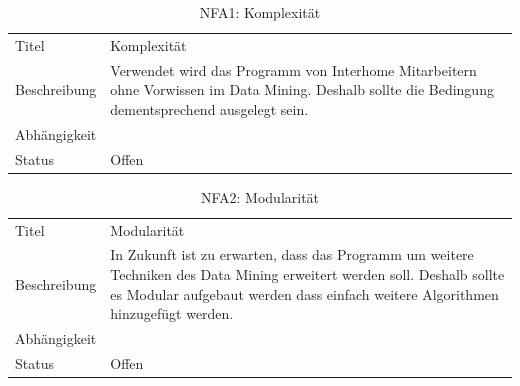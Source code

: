 
\begin{table}[H] 
	\caption{NFA1: Komplexität}
	\centering
	\label{fig:anforderungsanalyse:nichtfunktionaleanforderung:nfa1}
	\begin{tabular}{ | l | L{10cm} | } 
		\hline 
		 \\ \hline 
		Titel & Komplexität \\ \hline 
		Beschreibung & Verwendet wird das Programm von Interhome Mitarbeitern ohne Vorwissen im Data Mining. Deshalb sollte die Bedingung dementsprechend ausgelegt sein. \\ \hline 
		Abhängigkeit & \\ \hline 
		Status & Offen \\ \hline 
	\end{tabular}
\end{table}

\begin{table}[H] 
	\caption{NFA2: Modularität}
	\centering
	\label{fig:anforderungsanalyse:nichtfunktionaleanforderung:nfa2}
	\begin{tabular}{ | l | L{10cm} | } 
		\hline 
		 \\ \hline 
		Titel & Modularität \\ \hline 
		Beschreibung & In Zukunft ist zu erwarten, dass das Programm um weitere Techniken des Data Mining erweitert werden soll. Deshalb sollte es Modular aufgebaut werden dass einfach weitere Algorithmen hinzugefügt werden. \\ \hline 
		Abhängigkeit & \\ \hline 
		Status & Offen \\ \hline 
	\end{tabular}
\end{table}


